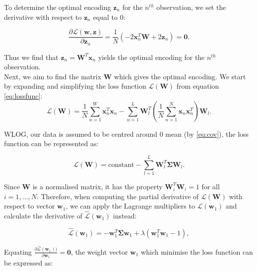 \documentclass{article}\usepackage[]{graphicx}\usepackage[]{xcolor}
\numberwithin{equation}{section}
\begin{document}
{\noindent
To determine the optimal encoding $\mathbf{z}_n$ for the $n^{th}$ observation, we set the derivative with respect to $\mathbf{z}_n $ equal to $0$:

$$\frac{\partial \mathcal{L}(\mathbf{w},\mathbf{z})}{\partial \mathbf{z}_n} = \frac{1}{N} (-2 \mathbf{x}_n^T\mathbf{W} + 2\mathbf{z}_n)= \mathbf{0}.$$

\noindent
Thus we find that $\mathbf{z}_n = \mathbf{W}^T\mathbf{x}_n$ yields the optimal encoding for the $n^{th}$ observation.\\

\noindent
Next, we aim to find the matrix $\mathbf{W}$ which gives the optimal encoding. We start by expanding and simplifying the loss function $\mathcal{L}(\mathbf{W})$ from equation \ref{eq:lossfunc}: \\

\begin{equation}
\mathcal{L}(\mathbf{W}) = \frac{1}{N} \sum_{n=1}^{W}\mathbf{x}_n^T\mathbf{x}_n - \sum_{n=1}^{L}\mathbf{W}_l^T(\frac{1}{N} \sum_{n=1}^{N}\mathbf{x}_n\mathbf{x}_n^T)\mathbf{W}_l.
\end{equation}

\noindent
WLOG, our data is assumed to be centred around $0$ mean (by \ref{eq:cov}), the loss function can be represented as:

\begin{equation}
\mathcal{L}(\mathbf{W}) = \mathrm{constant} - \sum_{l=1}^L\mathbf{W}_l^T\mathbf{\Sigma}\mathbf{W}_l.
\end{equation}

\noindent 
Since $\mathbf{W}$ is a normalised matrix, it has the property $\mathbf{W}_i^T\mathbf{W}_i =1$ for all $i =1, \dots, N$. Therefore, when computing the partial derivative of $\mathcal{L}(\mathbf{W})$ with respect to vector $\mathbf{w}_1$, we can apply the Lagrange multipliers to $\mathcal{L}(\mathbf{w}_1)$ and calculate the derivative of $\hat{\mathcal{L}}(\mathbf{w}_1)$ instead:

\begin{equation}
\hat{\mathcal{L}}(\mathbf{w}_1) = - \mathbf{w}_1^T\mathbf{\Sigma}\mathbf{w}_1 + \lambda(\mathbf{w}_1^T\mathbf{w}_1 -1),
\end{equation}

\noindent 
Equating $\frac{\partial \hat{\mathcal{L}}(\mathbf{w}_1))}{\partial \mathbf{w}_1} = \mathbf{0}$, the weight vector $\mathbf{w}_1$ which minimise the loss function can be expressed as:

}
\end{document}
